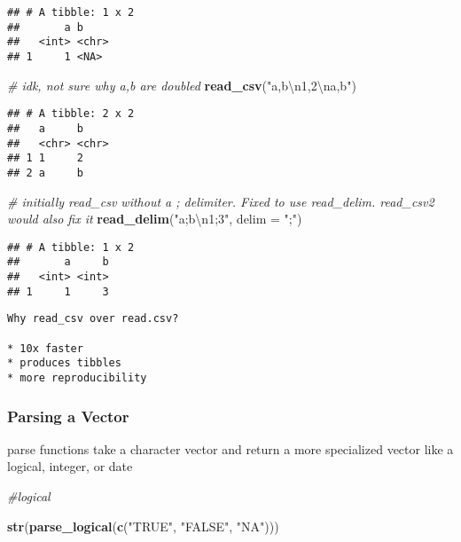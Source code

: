 \documentclass[]{article}
\newenvironment{Shaded}{\begin{snugshade}}{\end{snugshade}}
\newcommand{\KeywordTok}[1]{\textcolor[rgb]{0.13,0.29,0.53}{\textbf{#1}}}
\newcommand{\DataTypeTok}[1]{\textcolor[rgb]{0.13,0.29,0.53}{#1}}
\newcommand{\CharTok}[1]{\textcolor[rgb]{0.31,0.60,0.02}{#1}}
\newcommand{\StringTok}[1]{\textcolor[rgb]{0.31,0.60,0.02}{#1}}
\newcommand{\CommentTok}[1]{\textcolor[rgb]{0.56,0.35,0.01}{\textit{#1}}}
\newcommand{\NormalTok}[1]{#1}
\begin{document}
\begin{verbatim}
## # A tibble: 1 x 2
##       a b    
##   <int> <chr>
## 1     1 <NA>
\end{verbatim}

\begin{Shaded}
\begin{Highlighting}[]
\CommentTok{# idk, not sure why a,b are doubled}
\KeywordTok{read_csv}\NormalTok{(}\StringTok{"a,b}\CharTok{\textbackslash{}n}\StringTok{1,2}\CharTok{\textbackslash{}n}\StringTok{a,b"}\NormalTok{)}
\end{Highlighting}
\end{Shaded}

\begin{verbatim}
## # A tibble: 2 x 2
##   a     b    
##   <chr> <chr>
## 1 1     2    
## 2 a     b
\end{verbatim}

\begin{Shaded}
\begin{Highlighting}[]
\CommentTok{# initially read_csv without a ; delimiter. Fixed to use read_delim. read_csv2 would also fix it}
\KeywordTok{read_delim}\NormalTok{(}\StringTok{"a;b}\CharTok{\textbackslash{}n}\StringTok{1;3"}\NormalTok{, }\DataTypeTok{delim =} \StringTok{";"}\NormalTok{)}
\end{Highlighting}
\end{Shaded}

\begin{verbatim}
## # A tibble: 1 x 2
##       a     b
##   <int> <int>
## 1     1     3
\end{verbatim}

\begin{verbatim}
Why read_csv over read.csv? 

* 10x faster
* produces tibbles 
* more reproducibility 
\end{verbatim}

\subsubsection{Parsing a Vector}\label{parsing-a-vector}

parse functions take a character vector and return a more specialized
vector like a logical, integer, or date

\begin{Shaded}
\begin{Highlighting}[]
\CommentTok{#logical }

\KeywordTok{str}\NormalTok{(}\KeywordTok{parse_logical}\NormalTok{(}\KeywordTok{c}\NormalTok{(}\StringTok{"TRUE"}\NormalTok{, }\StringTok{"FALSE"}\NormalTok{, }\StringTok{"NA"}\NormalTok{)))}
\end{Highlighting}
\end{Shaded}
\end{document}
